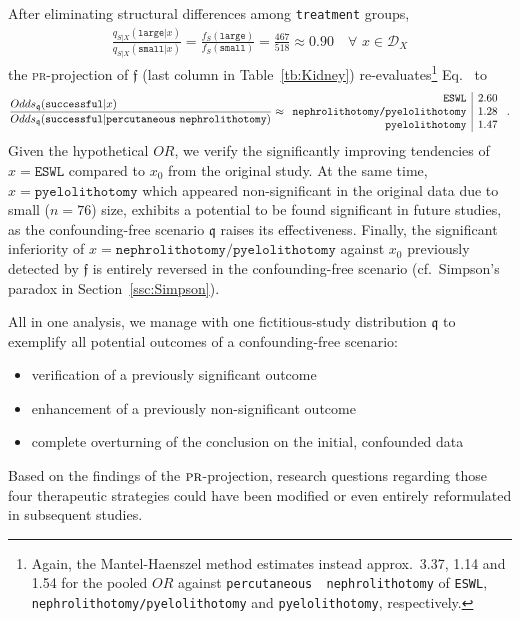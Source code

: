 \documentclass[10pt]{article}
\renewcommand{\eqref}{Eq.~\originaleqref}
\newcommand{\equ}[1]{\begin{gather} #1 \end{gather}}
\newcommand{\prob}[1]{\mathfrak{#1}}
\begin{document}
After eliminating structural differences among \texttt{treatment} groups,
\equ{
\frac{ q_{S\vert X}(\texttt{large} \vert x)}{ q_{S\vert X}(\texttt{small} \vert x)} = \frac{ f_{S}(\texttt{large})}{ f_{S}(\texttt{small})}=\frac{467}{518}\approx0.90
\quad\forall\,\,x\in\mathcal D_X
}
the \textsc{pr}-projection of $\prob f$ (last column in Table~\ref{tb:Kidney}) re-evaluates\footnote{Again, the Mantel-Haenszel method estimates instead approx.\ 3.37, 1.14 and 1.54 for the pooled $OR$ against \texttt{percutaneous\,\,nephrolithotomy} of \texttt{ESWL}, \texttt{nephrolithotomy/pyelolithotomy} and \texttt{pyelolithotomy}, respectively.} \eqref{eq:Kidney:Intervention} to
\equ{
\frac{Odds_{\prob q}(\texttt{successful}\vert x)\phantom{percutaneous..nephrolithotomy}}{Odds_{\prob q}(\texttt{successful}\vert \texttt{percutaneous\,\,nephrolithotomy})} \approx
\begin{array}{r|r}
   \texttt{ESWL} & 2.60 \\
   \texttt{nephrolithotomy/pyelolithotomy} & 1.28	 	\\
   \texttt{pyelolithotomy} & 1.47 	\\
\end{array}
~.
}
Given the hypothetical $OR$, we verify the significantly improving tendencies of $x=\texttt{ESWL}$ compared to $x_0$ from the original study.  At the same time, $x=\texttt{pyelolithotomy}$ which appeared non-significant in the original data due to small ($n=76$) size, exhibits a potential to be found significant in future studies, as the confounding-free scenario $\prob q$ raises its effectiveness. Finally, the significant inferiority of $x=\texttt{nephrolithotomy/pyelolithotomy}$ against $x_0$ previously detected by $\prob f$ is entirely reversed in the confounding-free scenario (cf.\ Simpson's paradox in Section~\ref{ssc:Simpson}). 

All in one analysis, we manage with one fictitious-study distribution $\prob q$ to exemplify all potential outcomes of a confounding-free scenario:  
\begin{itemize}
    \item verification of a previously  significant outcome
    \item enhancement of a previously non-significant outcome 
    \item complete overturning of the conclusion on the initial, confounded data
\end{itemize}
Based on the findings of the $\textsc{pr}$-projection,  research questions regarding those four therapeutic strategies could have been modified or even entirely reformulated in subsequent studies.  
\end{document}
